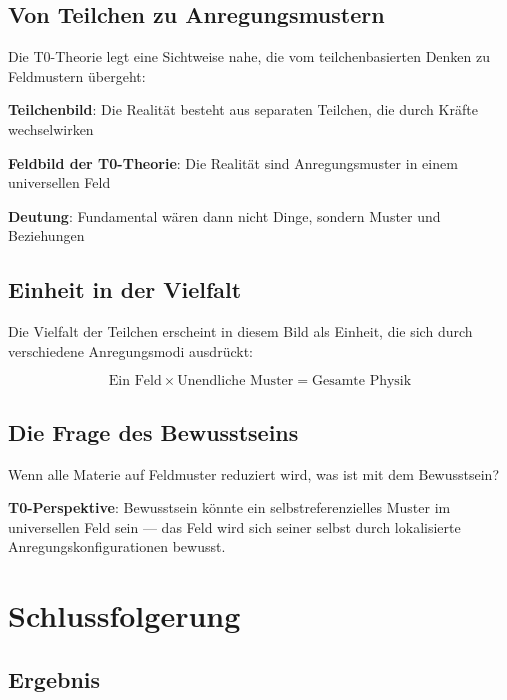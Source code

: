 	\subsection{Von Teilchen zu Anregungsmustern}
	
	Die T0-Theorie legt eine Sichtweise nahe, die vom teilchenbasierten Denken zu Feldmustern übergeht:
	
	\begin{tcolorbox}[colback=purple!5!white,colframe=purple!75!black,title=Sichtweise: Von Teilchen zu Mustern]
		\textbf{Teilchenbild}: Die Realität besteht aus separaten Teilchen, die durch Kräfte wechselwirken
		
		\textbf{Feldbild der T0-Theorie}: Die Realität sind Anregungsmuster in einem universellen Feld
		
		\textbf{Deutung}: Fundamental wären dann nicht Dinge, sondern Muster und Beziehungen
	\end{tcolorbox}
	
	\subsection{Einheit in der Vielfalt}
	
	Die Vielfalt der Teilchen erscheint in diesem Bild als Einheit, die sich durch verschiedene Anregungsmodi ausdrückt:
	
	\begin{equation}
		\boxed{\text{Ein Feld} \times \text{Unendliche Muster} = \text{Gesamte Physik}}
		\label{eq:ultimate_unity}
	\end{equation}
	
	\subsection{Die Frage des Bewusstseins}
	
	Wenn alle Materie auf Feldmuster reduziert wird, was ist mit dem Bewusstsein?
	
	\textbf{T0-Perspektive}: Bewusstsein könnte ein selbstreferenzielles Muster im universellen Feld sein --- das Feld wird sich seiner selbst durch lokalisierte Anregungskonfigurationen bewusst.
	
	\section{Schlussfolgerung}
	
	\subsection{Ergebnis}
	
